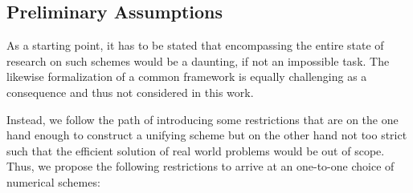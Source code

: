 \documentclass[sn-mathphys,Numbered]{sn-jnl}%
\theoremstyle{thmstyleone}%
\theoremstyle{thmstyletwo}%
\theoremstyle{thmstylethree}%
\begin{document}
\subsection{Preliminary Assumptions}\label{sec:restrictions}

As a starting point, it has to be stated that encompassing the entire state of research on such schemes would be a daunting, if not an impossible task.
The likewise formalization of a common framework is equally challenging as a consequence and thus not considered in this work.

Instead, we follow the path of introducing some restrictions that are on the one hand enough to construct a unifying scheme but on the other hand not too strict such that the efficient solution of real world problems would be out of scope.
Thus, we propose the following restrictions to arrive at an one-to-one choice of numerical schemes:
\end{document}
